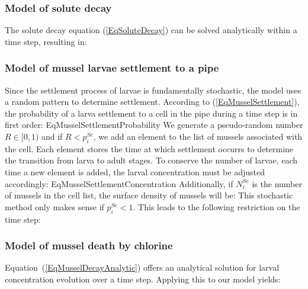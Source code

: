 \documentclass[review,authoryear]{elsarticle}
\begin{document}
\subsubsection{Model of solute decay}

The solute decay equation (\ref{EqSoluteDecay}) can be solved analytically
within a time step, resulting in:

\subsubsection{Model of mussel larvae settlement to a pipe}

Since the settlement process of larvae is fundamentally stochastic, the model
uses a random pattern to determine settlement. According to
(\ref{EqMusselSettlement}), the probability of a larva settlement to a cell in
the pipe during a time step is in first order:
{EqMusselSettlementProbability}
We generate a pseudo-random number $R\in[0,1)$ and if $R<p_i^{Se}$, we add an
element to the list of mussels associated with the cell. Each element stores the
time at which settlement occurrs to determine the transition from larva to adult
stages. To conserve the number of larvae, each time a new element is added, the
larval concentration must be adjusted accordingly:
{EqMusselSettlementConcentration}
Additionally, if $N_i^{Se}$ is the number of mussels in the cell list, the
surface density of mussels will be:
This stochastic method only makes sense if $p_i^{Se}<1$. This leads to the
following restriction on the time step:

\subsubsection{Model of mussel death by chlorine}

Equation~(\ref{EqMusselDecayAnalytic}) offers an analytical solution for larval
concentration evolution over a time step. Applying this to our model yields:
\end{document}

